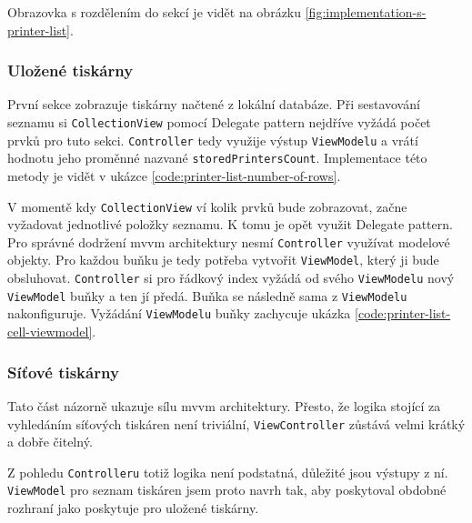Obrazovka s rozdělením do sekcí je vidět na obrázku \ref{fig:implementation-s-printer-list}.


\subsubsection*{Uložené tiskárny}

První sekce zobrazuje tiskárny načtené z lokální databáze.
Při sestavování seznamu si \texttt{CollectionView} pomocí Delegate pattern nejdříve vyžádá počet prvků pro tuto sekci.
\texttt{Controller} tedy využije výstup \texttt{ViewModelu} a vrátí hodnotu jeho proměnné nazvané \texttt{storedPrintersCount}.
Implementace této metody je vidět v ukázce \ref{code:printer-list-number-of-rows}.


V momentě kdy \texttt{CollectionView} ví kolik prvků bude zobrazovat, začne vyžadovat jednotlivé položky seznamu.
K tomu je opět využit Delegate pattern.
Pro správné dodržení \acrshort{mvvm} architektury nesmí \texttt{Controller} využívat modelové objekty.
Pro každou buňku je tedy potřeba vytvořit \texttt{ViewModel}, který ji bude obsluhovat.
\texttt{Controller} si pro řádkový index vyžádá od svého \texttt{ViewModelu} nový \texttt{ViewModel} buňky a ten jí předá.
Buňka se následně sama z \texttt{ViewModelu} nakonfiguruje.
Vyžádání \texttt{ViewModelu} buňky zachycuje ukázka \ref{code:printer-list-cell-viewmodel}.


\subsubsection*{Síťové tiskárny}

Tato část názorně ukazuje sílu \acrshort{mvvm} architektury.
Přesto, že logika stojící za vyhledáním síťových tiskáren není triviální, \texttt{ViewController} zůstává velmi krátký a dobře čitelný.

Z pohledu \texttt{Controlleru} totiž logika není podstatná, důležité jsou výstupy z ní.
\texttt{ViewModel} pro seznam tiskáren jsem proto navrh tak, aby poskytoval obdobné rozhraní jako poskytuje pro uložené tiskárny.

